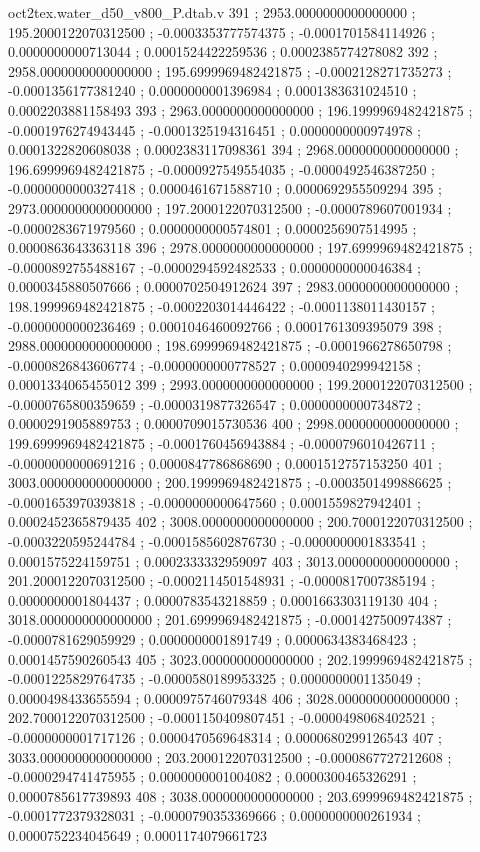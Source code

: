 \begin{filecontents}[overwrite]{oct2tex.water_d50_v800_P.dtab.v}
391 ; 2953.0000000000000000 ; 195.2000122070312500 ; -0.0003353777574375 ; -0.0001701584114926 ; 0.0000000000713044 ; 0.0001524422259536 ; 0.0002385774278082
392 ; 2958.0000000000000000 ; 195.6999969482421875 ; -0.0002128271735273 ; -0.0001356177381240 ; 0.0000000001396984 ; 0.0001383631024510 ; 0.0002203881158493
393 ; 2963.0000000000000000 ; 196.1999969482421875 ; -0.0001976274943445 ; -0.0001325194316451 ; 0.0000000000974978 ; 0.0001322820608038 ; 0.0002383117098361
394 ; 2968.0000000000000000 ; 196.6999969482421875 ; -0.0000927549554035 ; -0.0000492546387250 ; -0.0000000000327418 ; 0.0000461671588710 ; 0.0000692955509294
395 ; 2973.0000000000000000 ; 197.2000122070312500 ; -0.0000789607001934 ; -0.0000283671979560 ; 0.0000000000574801 ; 0.0000256907514995 ; 0.0000863643363118
396 ; 2978.0000000000000000 ; 197.6999969482421875 ; -0.0000892755488167 ; -0.0000294592482533 ; 0.0000000000046384 ; 0.0000345880507666 ; 0.0000702504912624
397 ; 2983.0000000000000000 ; 198.1999969482421875 ; -0.0002203014446422 ; -0.0001138011430157 ; -0.0000000000236469 ; 0.0001046460092766 ; 0.0001761309395079
398 ; 2988.0000000000000000 ; 198.6999969482421875 ; -0.0001966278650798 ; -0.0000826843606774 ; -0.0000000000778527 ; 0.0000940299942158 ; 0.0001334065455012
399 ; 2993.0000000000000000 ; 199.2000122070312500 ; -0.0000765800359659 ; -0.0000319877326547 ; 0.0000000000734872 ; 0.0000291905889753 ; 0.0000709015730536
400 ; 2998.0000000000000000 ; 199.6999969482421875 ; -0.0001760456943884 ; -0.0000796010426711 ; -0.0000000000691216 ; 0.0000847786868690 ; 0.0001512757153250
401 ; 3003.0000000000000000 ; 200.1999969482421875 ; -0.0003501499886625 ; -0.0001653970393818 ; -0.0000000000647560 ; 0.0001559827942401 ; 0.0002452365879435
402 ; 3008.0000000000000000 ; 200.7000122070312500 ; -0.0003220595244784 ; -0.0001585602876730 ; -0.0000000001833541 ; 0.0001575224159751 ; 0.0002333332959097
403 ; 3013.0000000000000000 ; 201.2000122070312500 ; -0.0002114501548931 ; -0.0000817007385194 ; 0.0000000001804437 ; 0.0000783543218859 ; 0.0001663303119130
404 ; 3018.0000000000000000 ; 201.6999969482421875 ; -0.0001427500974387 ; -0.0000781629059929 ; 0.0000000001891749 ; 0.0000634383468423 ; 0.0001457590260543
405 ; 3023.0000000000000000 ; 202.1999969482421875 ; -0.0001225829764735 ; -0.0000580189953325 ; 0.0000000001135049 ; 0.0000498433655594 ; 0.0000975746079348
406 ; 3028.0000000000000000 ; 202.7000122070312500 ; -0.0001150409807451 ; -0.0000498068402521 ; -0.0000000001717126 ; 0.0000470569648314 ; 0.0000680299126543
407 ; 3033.0000000000000000 ; 203.2000122070312500 ; -0.0000867727212608 ; -0.0000294741475955 ; 0.0000000001004082 ; 0.0000300465326291 ; 0.0000785617739893
408 ; 3038.0000000000000000 ; 203.6999969482421875 ; -0.0001772379328031 ; -0.0000790353369666 ; 0.0000000000261934 ; 0.0000752234045649 ; 0.0001174079661723
\end{filecontents}
